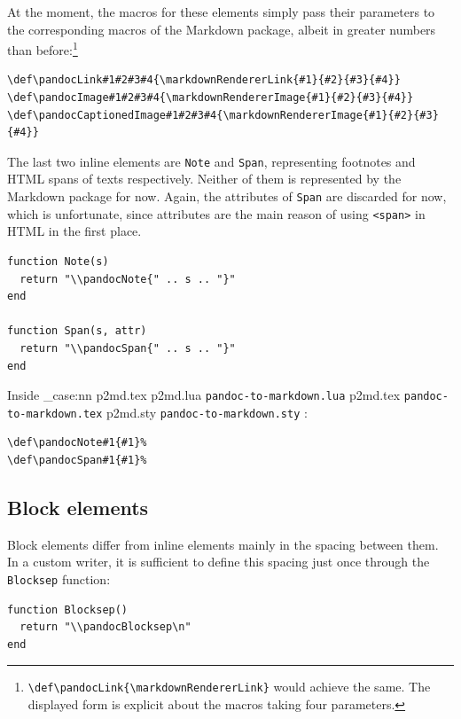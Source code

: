 \documentclass[
  digital,     %
  oneside,     %
  nosansbold,  %
  nocolorbold, %
  lof,         %
  nolot,       %
]{fithesis4}
\newcommand\macro[1]{\texttt{\textbackslash{}{#1}}}
\newcommand\file[1]
  {
    \str_case:nn
      { #1 }
      {
        { p2md.lua } { \texttt{pandoc\hyp{}to\hyp{}markdown.lua} }
        { p2md.tex } { \texttt{pandoc\hyp{}to\hyp{}markdown.tex} }
        { p2md.sty } { \texttt{pandoc\hyp{}to\hyp{}markdown.sty} }
      }
  }
\begin{document}
\noindent
At the moment, the macros for these elements simply pass their parameters to the corresponding macros of the Markdown package, albeit in greater numbers than before:\footnote{
\texttt{\macro{def}\macro{pandocLink}\{\macro{markdownRendererLink}\}}
would achieve the same. The displayed form is explicit about the macros taking four parameters.
}

\noindent
\lstset{language=[plain]TeX}
\begin{lstlisting}
\def\pandocLink#1#2#3#4{\markdownRendererLink{#1}{#2}{#3}{#4}}
\def\pandocImage#1#2#3#4{\markdownRendererImage{#1}{#2}{#3}{#4}}
\def\pandocCaptionedImage#1#2#3#4{\markdownRendererImage{#1}{#2}{#3}{#4}}
\end{lstlisting}

\noindent
The last two inline elements are \texttt{Note} and \texttt{Span}, representing footnotes and HTML spans of texts respectively. Neither of them is represented by the Markdown package for now. Again, the attributes of \texttt{Span} are discarded for now, which is unfortunate, since attributes are the main reason of using \texttt{<span>} in HTML in the first place.

\noindent
\lstset{language=[5.3]Lua}
\begin{lstlisting}
function Note(s)
  return "\\pandocNote{" .. s .. "}"
end

function Span(s, attr)
  return "\\pandocSpan{" .. s .. "}"
end
\end{lstlisting}

\noindent
Inside \file{p2md.tex}:

\noindent
\lstset{language=[plain]TeX}
\begin{lstlisting}
\def\pandocNote#1{#1}%
\def\pandocSpan#1{#1}%
\end{lstlisting}

\subsection{Block elements}

Block elements differ from inline elements mainly in the spacing between them. In a custom writer, it is sufficient to define this spacing just once through the \texttt{Blocksep} function:

\noindent
\lstset{language=[5.3]Lua}
\begin{lstlisting}
function Blocksep()
  return "\\pandocBlocksep\n"
end
\end{lstlisting}
\end{document}
